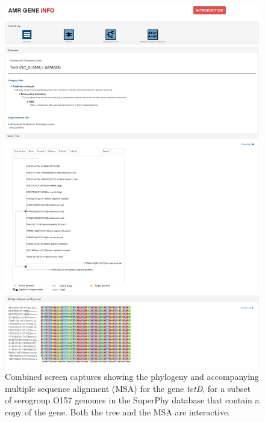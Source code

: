 \documentclass[doublespacing, linenumbers]{bmcart}
\begin{document}
\begin{backmatter}
\newpage
\begin{figure}[h!]
    \includegraphics[width=1.2\columnwidth]{images/msa.png}
    \caption{Combined screen captures showing the phylogeny and accompanying multiple sequence alignment (MSA) for the gene \textit{tetD}, for a subset of serogroup O157 genomes in the SuperPhy database that contain a copy of the gene. Both the tree and the MSA are interactive.}
    \label{fig:msa}
\end{figure}


\end{backmatter}
\end{document}
